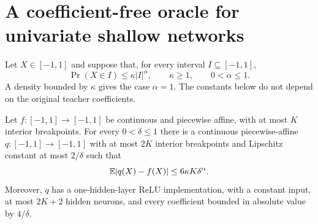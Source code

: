 \section{A coefficient-free oracle for univariate shallow networks}
\label{sec:univariate-coefficient-free}
Let $X\in[-1,1]$ and suppose that, for every interval $I\subseteq[-1,1]$,
\begin{equation}
 \Pr(X\in I)\le\kappa |I|^\alpha,
 \qquad \kappa\ge1,\qquad 0<\alpha\le1.
 \label{eq:univariate-regularity}
\end{equation}
A density bounded by $\kappa$ gives the case $\alpha=1$. The constants
below do not depend on the original teacher coefficients.

\begin{lemma}
\label{lem:bounded-slope-spline}
Let $f:[-1,1]\to[-1,1]$ be continuous and piecewise affine, with at most
$K$ interior breakpoints. For every $0<\delta\le1$ there is a continuous
piecewise-affine $q:[-1,1]\to[-1,1]$ with at most $2K$ interior
breakpoints and Lipschitz constant at most $2/\delta$ such that
\begin{equation}
 \mathbb E|q(X)-f(X)|\le6\kappa K\delta^\alpha.
 \label{eq:spline-approximation}
\end{equation}
Moreover, $q$ has a one-hidden-layer ReLU implementation, with a
constant input, at most $2K+2$ hidden neurons, and every coefficient
bounded in absolute value by $4/\delta$.
\end{lemma}
